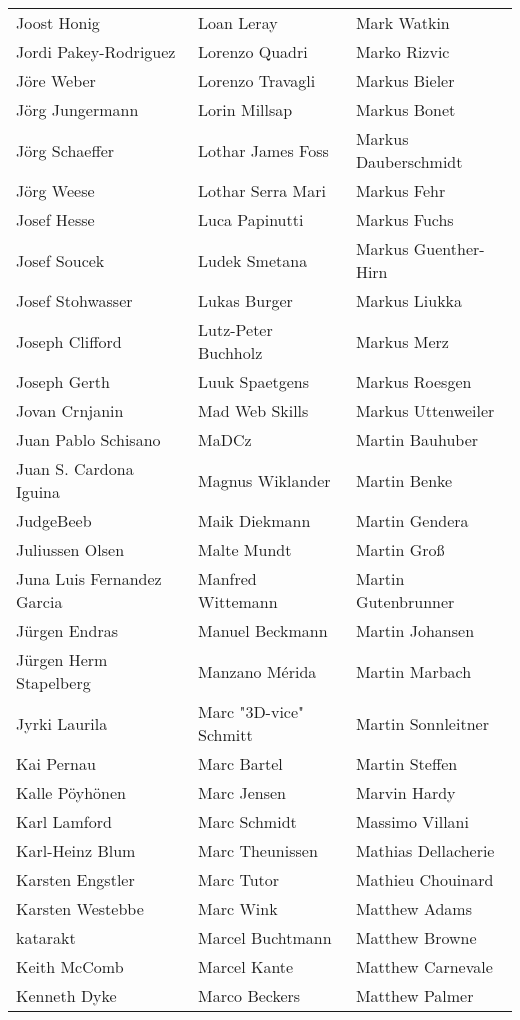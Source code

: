 \begin{small}
\begin{tabular}{p{4cm}p{4cm}p{4cm}}
Joost Honig & Loan Leray & Mark Watkin \\
Jordi Pakey-Rodriguez & Lorenzo Quadri & Marko Rizvic \\
Jöre Weber & Lorenzo Travagli & Markus Bieler \\
Jörg Jungermann & Lorin Millsap & Markus Bonet \\
Jörg Schaeffer & Lothar James Foss & Markus Dauberschmidt \\
Jörg Weese & Lothar Serra Mari & Markus Fehr \\
Josef Hesse & Luca Papinutti & Markus Fuchs \\
Josef Soucek & Ludek Smetana & Markus Guenther-Hirn \\
Josef Stohwasser & Lukas Burger & Markus Liukka \\
Joseph Clifford & Lutz-Peter Buchholz & Markus Merz \\
Joseph Gerth & Luuk Spaetgens & Markus Roesgen \\
Jovan Crnjanin & Mad Web Skills & Markus Uttenweiler \\
Juan Pablo Schisano & MaDCz & Martin Bauhuber \\
Juan S. Cardona Iguina & Magnus Wiklander & Martin Benke \\
JudgeBeeb & Maik Diekmann & Martin Gendera \\
Juliussen Olsen & Malte Mundt & Martin Groß \\
Juna Luis Fernandez Garcia & Manfred Wittemann & Martin Gutenbrunner \\
Jürgen Endras & Manuel Beckmann & Martin Johansen \\
Jürgen Herm Stapelberg & Manzano Mérida & Martin Marbach \\
Jyrki Laurila & Marc "3D-vice" Schmitt & Martin Sonnleitner \\
Kai Pernau & Marc Bartel & Martin Steffen \\
Kalle Pöyhönen & Marc Jensen & Marvin Hardy \\
Karl Lamford & Marc Schmidt & Massimo Villani \\
Karl-Heinz Blum & Marc Theunissen & Mathias Dellacherie \\
Karsten Engstler & Marc Tutor & Mathieu Chouinard \\
Karsten Westebbe & Marc Wink & Matthew Adams \\
katarakt & Marcel Buchtmann & Matthew Browne \\
Keith McComb & Marcel Kante & Matthew Carnevale \\
Kenneth Dyke & Marco Beckers & Matthew Palmer \\

\end{tabular}
\end{small}
